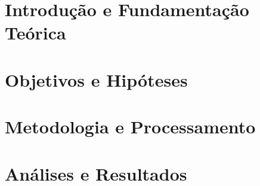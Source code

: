 \documentclass[
  12pt,
  openany,
  twoside,
  a4paper,
  english,
  brazil
]{abntex2}
\begin{document}
\tableofcontents*
\cleardoublepage

\textual
{}
\setcounter{page}{1}

\part{Introdução e Fundamentação Teórica}


\part{Objetivos e Hipóteses}



\part{Metodologia e Processamento}



\part{Análises e Resultados}
 





\postextual







\end{document}
